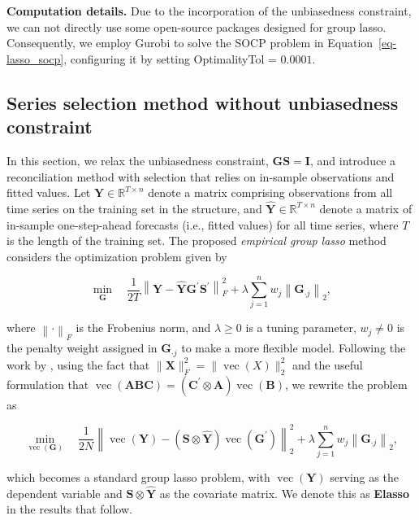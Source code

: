 \documentclass[11pt,a4paper,]{article}
\begin{document}
\textbf{Computation details.} Due to the incorporation of the
unbiasedness constraint, we can not directly use some open-source
packages designed for group lasso. Consequently, we employ Gurobi to
solve the SOCP problem in Equation~\ref{eq-lasso_socp}, configuring it
by setting OptimalityTol = \(0.0001\).

\hypertarget{sec-unconstrained}{%
\subsection{Series selection method without unbiasedness
constraint}\label{sec-unconstrained}}

In this section, we relax the unbiasedness constraint,
\(\boldsymbol{GS} = \boldsymbol{I}\), and introduce a reconciliation
method with selection that relies on in-sample observations and fitted
values. Let \(\boldsymbol{Y} \in \mathbb{R}^{T \times n}\) denote a
matrix comprising observations from all time series on the training set
in the structure, and
\(\hat{\boldsymbol{Y}} \in \mathbb{R}^{T \times n}\) denote a matrix of
in-sample one-step-ahead forecasts (i.e., fitted values) for all time
series, where \(T\) is the length of the training set. The proposed
\emph{empirical group lasso} method considers the optimization problem
given by

\[
\min _{\boldsymbol{G}} \quad \frac{1}{2 T} \left\|\boldsymbol{Y}-\hat{\boldsymbol{Y}} \boldsymbol{G}^{\prime} \boldsymbol{S}^{\prime}\right\|_F^2 + \lambda \sum_{j=1}^n w_j \left\|\boldsymbol{G}_{\cdot j}\right\|_2,
\]

where \(\left\| \cdot \right\|_F\) is the Frobenius norm, and
\(\lambda \geq 0\) is a tuning parameter, \(w_j \neq 0\) is the penalty
weight assigned in \(\boldsymbol{G}_{\cdot j}\) to make a more flexible
model. Following the work by \textcite{Ben_Taieb2019-be}, using the fact
that \(\|\boldsymbol{X}\|_F^2 = \|\operatorname{vec}(X)\|_2^2\) and the
useful formulation that
\(\operatorname{vec}(\boldsymbol{ABC}) = (\boldsymbol{C}^{\prime} \otimes \boldsymbol{A})\operatorname{vec}(\boldsymbol{B})\),
we rewrite the problem as

\[
\min _{\operatorname{vec}(\boldsymbol{G})} \quad \frac{1}{2 N} \left\|\operatorname{vec}(\boldsymbol{Y})-(\boldsymbol{S} \otimes \hat{\boldsymbol{Y}}) \operatorname{vec}\left(\boldsymbol{G}^{\prime}\right)\right\|_2^2 + \lambda \sum_{j=1}^n w_j \left\|\boldsymbol{G}_{\cdot j}\right\|_2,
\]

which becomes a standard group lasso problem, with
\(\operatorname{vec}(\boldsymbol{Y})\) serving as the dependent variable
and \(\boldsymbol{S} \otimes \hat{\boldsymbol{Y}}\) as the covariate
matrix. We denote this as \textbf{Elasso} in the results that follow.
\end{document}
